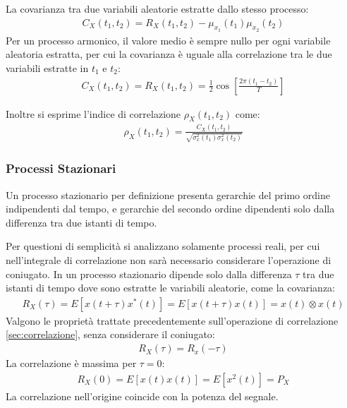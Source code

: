 \documentclass{article}
\numberwithin{equation}{subsection}
\begin{document}
La covarianza tra due variabili aleatorie estratte dallo stesso processo:
\begin{gather*}
    C_X(t_1,t_2)=R_X(t_1,t_2)-\mu_{x_1}(t_1)\mu_{x_2}(t_2)
\end{gather*}
Per un processo armonico, il valore medio è sempre nullo per ogni variabile aleatoria estratta, per cui la covarianza è uguale alla correlazione tra le due variabili 
estratte in $t_1$ e $t_2$:
\begin{gather*}
    C_X(t_1,t_2)=R_X(t_1,t_2)=\displaystyle\frac{1}{2}\cos\left[\frac{2\pi(t_1-t_2)}{T}\right]
\end{gather*} 

Inoltre si esprime l'indice di correlazione $\rho_{X}(t_1,t_2)$ come:
\begin{gather*}
    \rho_X(t_1,t_2)=\displaystyle\frac{C_X(t_1,t_2)}{\sqrt{\sigma_x^2(t_1)\sigma_x^2(t_2)}}
\end{gather*}

\subsubsection{Processi Stazionari}

Un processo stazionario per definizione presenta gerarchie del primo ordine indipendenti dal tempo, e gerarchie del secondo ordine dipendenti solo dalla differenza tra due 
istanti di tempo. 

Per questioni di semplicità si analizzano solamente processi reali, per cui nell'integrale di correlazione non sarà necessario considerare l'operazione di coniugato. In 
un processo stazionario dipende solo dalla differenza $\tau$ tra due istanti di tempo dove sono estratte le variabili aleatorie, come la covarianza:
\begin{gather*}
    R_X(\tau)=E[x(t+\tau)x^*(t)]=E[x(t+\tau)x(t)]=x(t)\otimes x(t)
\end{gather*}
Valgono le proprietà trattate precedentemente sull'operazione di correlazione \ref{sec:correlazione}, senza considerare il coniugato:
\begin{gather*}
    R_X(\tau)=R_x(-\tau)
\end{gather*} 
La correlazione è massima per $\tau=0$:
\begin{gather*}
    R_X(0)=E[x(t)x(t)]=E[x^2(t)]=P_X
\end{gather*}
La correlazione nell'origine coincide con la potenza del segnale. 
\end{document}
